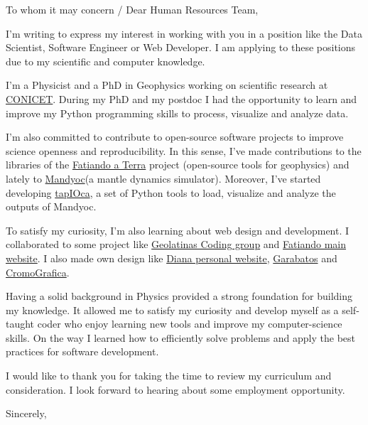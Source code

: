 \documentclass[a4paper,10pt]{letter}
\date{February 25, 2021}
\begin{document}
\begin{letter}
{To whom it may concern / Dear Human Resources Team,}
\opening{}

I'm writing to express my interest in working with you in a position like the 
Data Scientist, Software Engineer or Web Developer.
I am applying to these positions due to my scientific and computer 
knowledge. 

I'm a Physicist and a PhD in Geophysics working on scientific research at
\href{https://www.conicet.gov.ar/}{CONICET}.
During my PhD and my postdoc I had the opportunity to learn and improve my
Python programming skills to process, visualize and analyze data. 

I'm also committed to contribute to open-source software projects to improve
science openness and reproducibility.
In this sense, I've made contributions to the libraries of the
\href{https://fatiando.org}{Fatiando a Terra} project (open-source tools for
geophysics) and lately to \href{https://github.com/ggciag/mandyoc}{Mandyoc}(a 
mantle dynamics simulator).
Moreover, I've started developing 
\href{https://github.com/aguspesce/tapioca}{tapIOca}, a set of Python tools to 
load, visualize and analyze the outputs of Mandyoc.

To satisfy my curiosity, I'm also learning about web design and development.
I collaborated to some project like 
\href{https://geolatinas.github.io/}{Geolatinas Coding group} and 
\href{https://www.fatiando.org/}{Fatiando main website}. 
I also made own design like \href{https://dianaceroallard.github.io/}{Diana 
personal website}, \href{https://aguspesce.github.io/garabatos/}{Garabatos} and 
\href{https://aguspesce.github.io/web-cromografica/}{CromoGrafica}. 

Having a solid background in Physics provided a strong foundation for building 
my knowledge.
It allowed me to satisfy my curiosity and develop myself as a self-taught coder 
who enjoy learning new tools and improve my computer-science skills.
On the way I learned how to efficiently solve problems and apply the best
practices for software development.

I would like to thank you for taking the time to review my curriculum and 
consideration. 
I look forward to hearing about some employment opportunity.


\closing{Sincerely,}


\end{letter}
\end{document}
